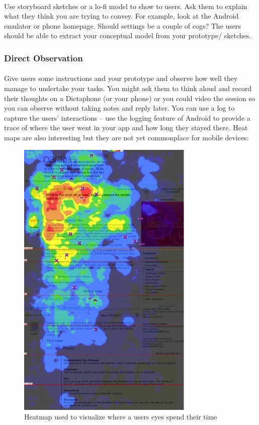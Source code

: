 \documentclass[12pt, a4paper, twoside]{book}
\begin{document}
\paragraph{} Use storyboard sketches or a lo-fi model to show to users. Ask them to explain what they think you are trying to convey. For example, look at the Android emulator or phone homepage. Should settings be a couple of cogs? The users should be able to extract your conceptual model from your prototype/ sketches.

\subsubsection{Direct Observation}
\paragraph{} Give users some instructions and your prototype and observe how well they manage to undertake your tasks. You might ask them to think aloud and record their thoughts on a Dictaphone (or your phone) or you could video the session so you can observe without taking notes and reply later. You can use a log to capture the users' interactions – use the logging feature of Android to provide a trace of where the user went in your app and how long they stayed there. Heat maps are also interesting but they are not yet commonplace for mobile devices:

\begin{figure}[H]
\centering
\includegraphics[width=0.75\textwidth]{images/heatmap}
\caption{Heatmap used to visualize where a users eyes spend their time}
\label{fig:heatmap}
\end{figure}
\end{document}
